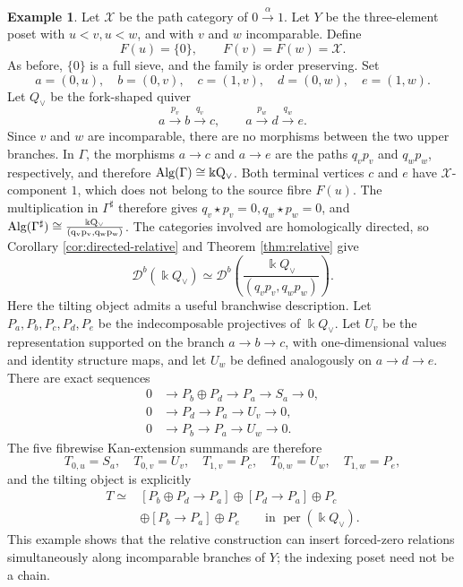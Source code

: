 \documentclass[12pt,a4paper,english,reqno]{amsart}
\theoremstyle{plain}
\theoremstyle{definition}
\newtheorem{exm}[theorem]{Example}
\newcommand{\kk}{\Bbbk}
\newcommand{\perf}{\operatorname{per}}
\newcommand{\X}{\mathcal X}
\newcommand{\G}{\Gamma}
\newcommand{\Gs}{\Gamma^{\sharp}}
\newcommand{\Db}[1]{{\mathscr D}^b(#1)}
\newcommand{\Alg}{\rm Alg}
\begin{document}
\begin{exm}
\label{ex:nonchain-Y}
Let $\X$ be the path category of $0\xrightarrow{\alpha}1$.  Let $Y$ be
the three-element poset with $u<v,u<w$,
and with $v$ and $w$ incomparable.  Define
\[
 F(u)=\{0\},
 \qquad
 F(v)=F(w)=\X.
\]
As before, $\{0\}$ is a full sieve, and the family is order preserving.
Set
\[
 a=(0,u),\quad b=(0,v),\quad c=(1,v),\quad
 d=(0,w),\quad e=(1,w).
\]
Let $Q_{\vee}$ be the fork-shaped quiver
\[
 a\xrightarrow{p_v}b\xrightarrow{q_v}c,
 \qquad
 a\xrightarrow{p_w}d\xrightarrow{q_w}e.
\]
Since $v$ and $w$ are incomparable, there are no morphisms between the
two upper branches.  In $\G$, the morphisms $a\to c$ and $a\to e$ are
the paths $q_vp_v$ and $q_wp_w$, respectively, and therefore $\Alg(\G)\cong\kk Q_{\vee}$.
Both terminal vertices $c$ and $e$ have $\X$-component $1$, which does
not belong to the source fibre $F(u)$.  The multiplication in $\Gs$
therefore gives $q_v\star p_v=0,q_w\star p_w=0$,
and $\Alg(\Gs)\cong\frac{\kk Q_{\vee}}{(q_vp_v,q_wp_w)}$.
The categories involved are homologically directed, so
Corollary \ref{cor:directed-relative} and Theorem \ref{thm:relative}
give
\[
 \Db{\kk Q_{\vee}}
 \simeq
 \Db{\frac{\kk Q_{\vee}}{(q_vp_v,q_wp_w)}}.
\]
Here the tilting object admits a useful branchwise description.  Let
$P_a,P_b,P_c,P_d,P_e$ be the indecomposable projectives of
$\kk Q_{\vee}$.  Let $U_v$ be the representation supported on the branch
$a\to b\to c$, with one-dimensional values and identity structure maps,
and let $U_w$ be defined analogously on $a\to d\to e$.  There are exact
sequences
\[
 \begin{aligned}
  0&\longrightarrow P_b\oplus P_d\longrightarrow P_a
       \longrightarrow S_a\longrightarrow0,\\
  0&\longrightarrow P_d\longrightarrow P_a
       \longrightarrow U_v\longrightarrow0,\\
  0&\longrightarrow P_b\longrightarrow P_a
       \longrightarrow U_w\longrightarrow0.
 \end{aligned}
\]
The five fibrewise Kan-extension summands are therefore
\[
 T_{0,u}=S_a,
 \quad T_{0,v}=U_v,
 \quad T_{1,v}=P_c,
 \quad T_{0,w}=U_w,
 \quad T_{1,w}=P_e,
\]
and the tilting object is explicitly
\[
 \begin{aligned}
 T\simeq{}&[P_b\oplus P_d\longrightarrow P_a]
 \oplus[P_d\longrightarrow P_a]\oplus P_c\\
 &\oplus[P_b\longrightarrow P_a]\oplus P_e
 \qquad\text{in }\perf(\kk Q_{\vee}).
 \end{aligned}
\]
This example shows that the relative construction can insert forced-zero
relations simultaneously along incomparable branches of $Y$; the indexing
poset need not be a chain.
\end{exm}
\end{document}
